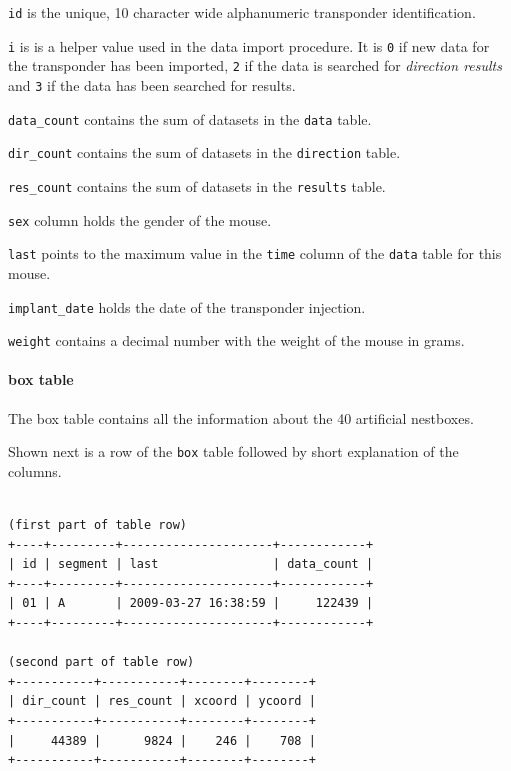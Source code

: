 \begin{mydesc}
	\item \lstinline|id| is the unique, 10 character wide alphanumeric transponder identification.
	\item \lstinline|i| is is a helper value used in the data import procedure. It is \lstinline|0| if new data for the transponder has been imported, \lstinline|2| if the data is searched for \textit{direction results} and \lstinline|3| if the data has been searched for results.
	\item \lstinline|data_count| contains the sum of datasets in the \lstinline|data| table.
	\item \lstinline|dir_count| contains the sum of datasets in the \lstinline|direction| table.
	\item \lstinline|res_count| contains the sum of datasets in the \lstinline|results| table.
	\item \lstinline|sex| column holds the gender of the mouse.
	\item \lstinline|last| points to the maximum value in the \lstinline|time| column of the \lstinline|data| table for this mouse. 
	\item \lstinline|implant_date| holds the date of the transponder injection.
	\item \lstinline|weight| contains a decimal number with the weight of the mouse in grams.
\end{mydesc}

\paragraph{box table}
\label{para:box_table}

The box table contains all the information about the 40 artificial nestboxes. 

Shown next is a row of the \lstinline|box| table followed by short explanation of the columns.
\codescript
\begin{lstlisting}[frame=none]

(first part of table row)
+----+---------+---------------------+------------+
| id | segment | last                | data_count |
+----+---------+---------------------+------------+
| 01 | A       | 2009-03-27 16:38:59 |     122439 | 
+----+---------+---------------------+------------+

(second part of table row)
+-----------+-----------+--------+--------+
| dir_count | res_count | xcoord | ycoord |
+-----------+-----------+--------+--------+
|     44389 |      9824 |    246 |    708 | 
+-----------+-----------+--------+--------+

\end{lstlisting}

